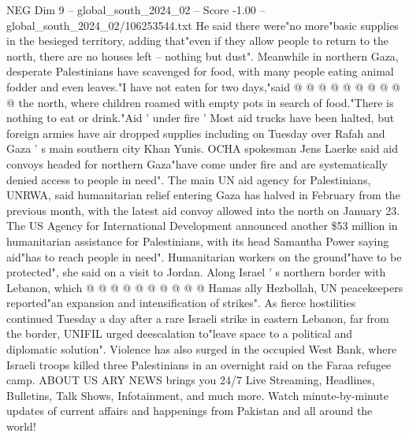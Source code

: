\begin{textsample}{NEG Dim 9 – global\_south\_2024\_02 – Score -1.00 – global\_south\_2024\_02/106253544.txt}
He said there were"no more"basic supplies in the besieged territory, adding that"even if they allow people to return to the north, there are no houses left -- nothing but dust".
Meanwhile in northern Gaza, desperate Palestinians have scavenged for food, with many people eating animal fodder and even leaves."I have not eaten for two days,"said @ @ @ @ @ @ @ @ @ @ the north, where children roamed with empty pots in search of food."There is nothing to eat or drink."Aid ' under fire ' Most aid trucks have been halted, but foreign armies have air dropped supplies including on Tuesday over Rafah and Gaza ' s main southern city Khan Yunis.
OCHA spokesman Jens Laerke said aid convoys headed for northern Gaza"have come under fire and are systematically denied access to people in need".
The main UN aid agency for Palestinians, UNRWA, said humanitarian relief entering Gaza has halved in February from the previous month, with the latest aid convoy allowed into the north on January 23.
The US Agency for International Development announced another \$53 million in humanitarian assistance for Palestinians, with its head Samantha Power saying aid"has to reach people in need".
Humanitarian workers on the ground"have to be protected", she said on a visit to Jordan.
Along Israel ' s northern border with Lebanon, which @ @ @ @ @ @ @ @ @ @ Hamas ally Hezbollah, UN peacekeepers reported"an expansion and intensification of strikes".
As fierce hostilities continued Tuesday a day after a rare Israeli strike in eastern Lebanon, far from the border, UNIFIL urged deescalation to"leave space to a political and diplomatic solution".
Violence has also surged in the occupied West Bank, where Israeli troops killed three Palestinians in an overnight raid on the Faraa refugee camp.
ABOUT US ARY NEWS brings you 24/7 Live Streaming, Headlines, Bulletins, Talk Shows, Infotainment, and much more.
Watch minute-by-minute updates of current affairs and happenings from Pakistan and all around the world!

\end{textsample}
